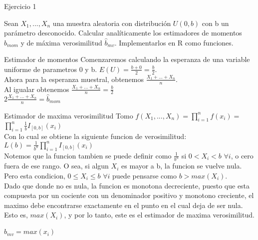
\begin{section}{Ejercicio 1}

Sean $X_1, ... ,X_n$ una muestra aleatoria con distribución $U(0, b)$ con b un parámetro desconocido. Calcular anal\'iticamente los estimadores de momentos $\hat{b}_{mom}$ y de máxima verosimilitud $\hat{b}_{mv}$. Implementarlos en R como funciones.


\begin{subsection}{Estimador de momentos}
Comenzaremos calculando la esperanza de una variable uniforme de parametros 0 y b. $E(U) = \frac{b+0}{2} = \frac{b}{2}.$\\
Ahora para la esperanza muestral, obtenemos $\frac{X_1+ ... +X_n}{n}$. \\
 Al igualar obtenemos $\frac{X_1+ ... +X_n}{n} = \frac{b}{2}$\\
 $2\frac{X_1+ ... +X_n}{n} = \hat{b}_{mom}$\\
\end{subsection}

\begin{subsection}{Estimador de maxima verosimilitud}
Tomo $f(X_1, ... ,X_n) = \prod_{i=1}^{n}{f(x_i)} = $ \\
$\prod_{i=1}^{n}{\frac{1}{b} I_{[0,b]}(x_i)}$ \\
Con lo cual se obtiene la siguiente funcion de verosimilitud:\\
$L(b) = \frac{1}{b^n} \prod_{i=1}^{n}{ I_{[0,b]}(x_i)}$\\
Notemos que la funcion tambien se puede definir como $\frac{1}{b^n}$ si $0 < X_i < b$ $ \forall i$, o cero fuera de ese rango. 
O sea, si algun $X_i$ es mayor a b, la funcion se vuelve nula. 
Pero esta condicion, $0 \leq X_i \leq b$ $ \forall i$ puede pensarse como $ b > max(X_i)$.\\
Dado que donde no es nula, la funcion es monotona decreciente, puesto que esta compuesta por un cociente con un denominador positivo y monotono creciente, el maximo debe encontrarse exactamente en el punto en el cual deja de ser nula. Esto es, $max(X_i)$, y por lo tanto, este es el estimador de maxima verosimilitud.\\
\centerline{$\hat{b}_{mv} = max(x_i)$}
\end{subsection}


\end{section}


